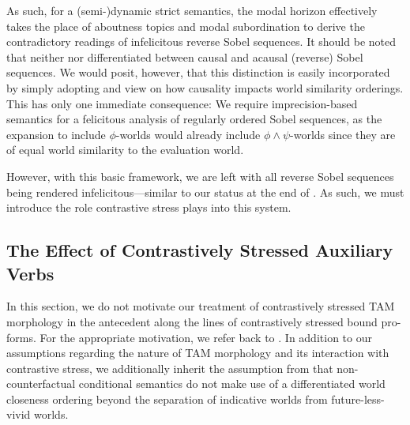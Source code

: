 As such, for a (semi-)dynamic strict semantics, the modal horizon effectively takes the place of aboutness topics and modal subordination to derive the contradictory readings of infelicitous reverse Sobel sequences. It should be noted that neither \textcite{Fintel2001} nor \textcite{Gillies2007} differentiated between causal and acausal (reverse) Sobel sequences. We would posit, however, that this distinction is easily incorporated by simply adopting \textcite{Bennett2003} and  view on how causality impacts world similarity orderings. This has only one immediate consequence: We require  imprecision-based semantics for a felicitous analysis of regularly ordered Sobel sequences, as the expansion to include $\phi$-worlds would already include $\phi\land\psi$-worlds since they are of equal world similarity to the evaluation world.

However, with this basic framework, we are left with all reverse Sobel sequences being rendered infelicitous---similar to our status at the end of . As such, we must introduce the role contrastive stress plays into this system.

\subsection{The Effect of Contrastively Stressed Auxiliary Verbs}
In this section, we do not motivate our treatment of contrastively stressed TAM morphology in the antecedent along the lines of contrastively stressed bound pro-forms. For the appropriate motivation, we refer back to . In addition to our assumptions regarding the nature of TAM morphology and its interaction with contrastive stress, we additionally inherit the assumption from  that non-counterfactual conditional semantics do not make use of a differentiated world closeness ordering beyond the separation of indicative worlds from future-less-vivid worlds.

